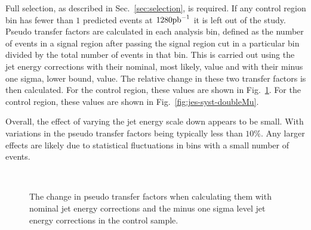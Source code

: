 Full selection, as described in Sec.~\ref{sec:selection}, is required.
If any control region bin has fewer
than $1$ predicted events at $1280\text{pb}^{-1}$ it is left out of the study.
Pseudo transfer factors are calculated in each analysis bin, defined
as the number of events in a signal region after passing the signal
region \alphat cut in a particular bin divided by the total number of
events in that bin. This is carried out using the jet energy
corrections with their nominal, most likely, value and with their
minus one sigma, lower bound, value. The relative change in these two
transfer factors is then calculated. For the \mj control region, these
values are shown in Fig.~\ref{fig:jes-syst-singleMu}. For the \mmj
control region, these values are shown in
Fig.~\ref{fig:jes-syst-doubleMu}. 

Overall, the effect of varying the jet energy scale down appears to be
small. With variations in the pseudo transfer factors being typically
less than $10\%$. Any larger effects are likely due to statistical
fluctuations in bins with a small number of events.


\begin{figure}[]
  \centering
   ~~
  \caption{\label{fig:jes-syst-singleMu} The change in pseudo transfer
  factors when calculating them with nominal jet energy corrections
  and the minus one sigma level jet energy corrections in the \mj
  control sample.}
\end{figure}

